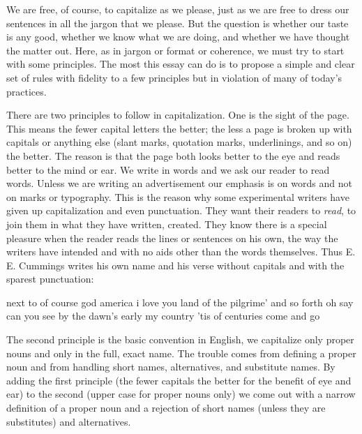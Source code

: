\documentclass[
    oneside,
    11pt,
    draft
]{memoir}
\begin{document}
We are free, of course, to capitalize as we please, just as we are free to dress our sentences in all the jargon that we please. But the question is whether our taste is any good, whether we know what we are doing, and whether we have thought the matter out. Here, as in jargon or format or coherence, we must try to start with some principles. The most this essay can do is to propose a simple and clear set of rules with fidelity to a few principles but in violation of many of today's practices.

There are two principles to follow in capitalization. One is the sight of the page. This means the fewer capital letters the better; the less a page is broken up with capitals or anything else (slant marks, quotation marks, underlinings, and so on) the better. The reason is that the page both looks better to the eye and reads better to the mind or ear. We write in words and we ask our reader to read words. Unless we are writing an advertisement our emphasis is on words and not on marks or typography. This is the reason why some experimental writers have given up capitalization and even punctuation. They want their readers to \emph{read}, to join them in what they have written, created. They know there is a special pleasure when the reader reads the lines or sentences on his own, the way the writers have intended and with no aids other than the words themselves. Thus E. E. Cummings writes his own name and his verse without capitals and with the sparest punctuation:

\begin{displayquote}
next to of course god america
i love you land of the pilgrime' and so forth oh
say can you see by the dawn's early my
country 'tis of centuries come and go
\end{displayquote}

The second principle is the basic convention in English, we capitalize only proper nouns and only in the full, exact name. The trouble comes from defining a proper noun and from handling short names, alternatives, and substitute names. By adding the first principle (the fewer capitals the better for the benefit of eye and ear) to the second (upper case for proper nouns only) we come out with a narrow definition of a proper noun and a rejection of short names (unless they are substitutes) and alternatives. 
\end{document}
